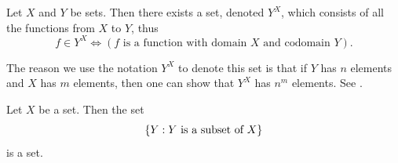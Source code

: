 \begin{ax}\label{i:3.10}
  Let \(X\) and \(Y\) be sets.
  Then there exists a set, denoted \(Y^X\), which consists of all the functions from \(X\) to \(Y\), thus
  \[
    f \in Y^X \iff (f \text{ is a function with domain } X \text{ and codomain } Y).
  \]
\end{ax}

\begin{note}
  The reason we use the notation \(Y^X\) to denote this set is that if \(Y\) has \(n\) elements and \(X\) has \(m\) elements, then one can show that \(Y^X\) has \(n^m\) elements.
  See .
\end{note}

\setcounter{thm}{8}
\begin{lem}\label{i:3.4.9}
  Let \(X\) be a set.
  Then the set
  \[
    \left\lbrace Y : Y \text{ is a subset of } X\right\rbrace
  \]
  is a set.
\end{lem}

